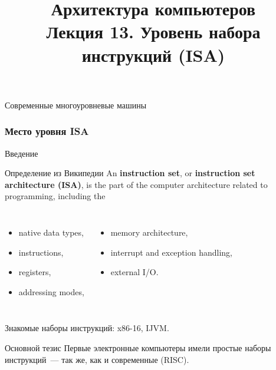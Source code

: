 \newcommand{\h}{%
handout,%
}



\title[Уровень набора инструкций]%
    {Архитектура компьютеров\texorpdfstring{\\}{ }%
    Лекция 13. Уровень набора инструкций (ISA)}



\begin{frame}
\titlepage
\end{frame}

\begin{frame}{Современные многоуровневые машины}
\end{frame}

\begin{frame}
\frametitle{Место уровня ISA}
\end{frame}


\begin{frame}{Введение}
\begin{block}{Определение из Википедии}
An \textbf{instruction set}, or \textbf{instruction set architecture (ISA)}, is the part of the computer architecture \alert{related to programming}, including the
\begin{columns}
    \column{6cm}
\begin{itemize}
    \item native data types,
    \item instructions,
    \item registers,
    \item addressing modes,
\end{itemize}
    \column{6cm}
\begin{itemize}
    \item memory architecture,
    \item interrupt and exception handling,
    \item external I/O.
\end{itemize}
\end{columns}
\end{block}

\pause
Знакомые наборы инструкций: x86-16, IJVM.

\pause
\begin{block}{Основной тезис}
Первые электронные компьютеры имели простые наборы инструкций~— так же, как и современные (\alert{RISC}).
\end{block}
\end{frame}


